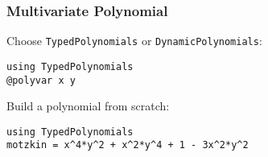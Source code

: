 \documentclass{beamer}
\begin{document}
  \begin{frame}[fragile]
    \frametitle{Multivariate Polynomial}
    Choose \verb|TypedPolynomials| or \verb|DynamicPolynomials|:
\begin{verbatim}
using TypedPolynomials
@polyvar x y
\end{verbatim}
    Build a polynomial from scratch:
\begin{verbatim}
using TypedPolynomials
motzkin = x^4*y^2 + x^2*y^4 + 1 - 3x^2*y^2
\end{verbatim}
  \end{frame}
\end{document}
